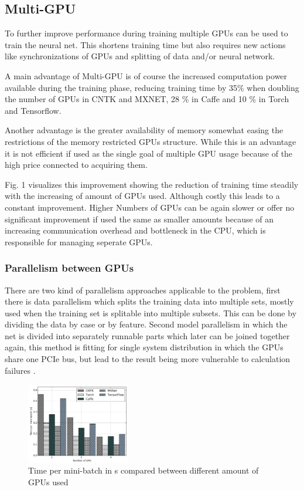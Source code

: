 \documentclass[conference]{IEEEtran}
\begin{document}
\subsection{Multi-GPU}
To further improve performance during training multiple GPUs can be used to train the neural net. This shortens training time but also requires new actions like synchronizations of GPUs and splitting of data and/or neural network.

A main advantage of Multi-GPU is of course the increased computation power available during the training phase, reducing training time by 35\% when doubling the number of GPUs in CNTK and MXNET, 28 \% in Caffe and 10 \% in  Torch and Tensorflow\cite{shi2016benchmarking}.

Another advantage is the greater availability of memory somewhat easing the restrictions of the memory restricted GPUs structure. While this is an advantage it is not efficient if used as the single goal of multiple GPU usage because of the high price connected to acquiring them.

Fig. 1 visualizes this improvement showing the reduction of training time steadily with the increasing of amount of GPUs used. Although costly this leads to a constant improvement. Higher Numbers of GPUs can be again slower or offer no significant improvement if used the same as smaller amounts because of an increasing communication overhead and bottleneck in the CPU, which is responsible for managing seperate GPUs.

\subsubsection{Parallelism between GPUs}
There are two kind of parallelism approaches applicable to the problem, first there is data parallelism which splits the training data into multiple sets, mostly used when the training set is splitable into multiple subsets. This can be done by dividing the data by case or by feature. Second model parallelism in which the net is divided into separately runnable parts which later can be joined together again, this method is fitting for single system distribution in which the GPUs share one PCIe bus, but lead to the result being more vulnerable to calculation failures \cite{sastre2017scalability}.


\begin{figure}
\centering
\includegraphics[width=0.4\textwidth]{a.png}

\caption{Time per mini-batch in s compared between different amount of GPUs used\cite{shi2016benchmarking}}
\label{fig_m_gpu}
\end{figure}
\end{document}
